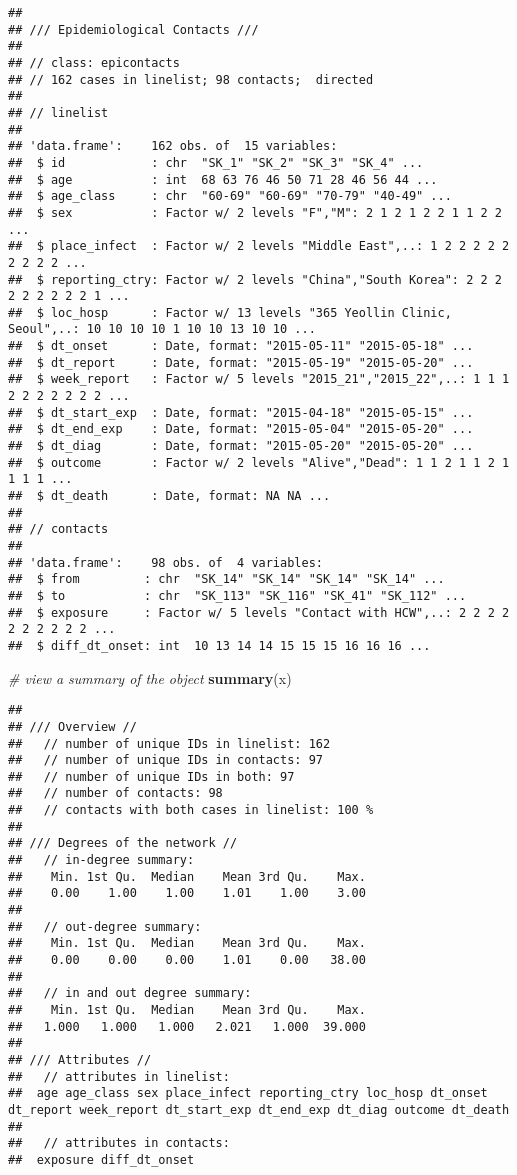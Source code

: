 \documentclass[9pt,a4paper,]{extarticle}
\newenvironment{Shaded}{\begin{snugshade}}{\end{snugshade}}
\newcommand{\KeywordTok}[1]{\textcolor[rgb]{0.13,0.29,0.53}{\textbf{#1}}}
\newcommand{\CommentTok}[1]{\textcolor[rgb]{0.56,0.35,0.01}{\textit{#1}}}
\newcommand{\NormalTok}[1]{#1}
\theoremstyle{definition}
\theoremstyle{definition}
\theoremstyle{definition}
\theoremstyle{remark}
\begin{document}
\begin{verbatim}
## 
## /// Epidemiological Contacts ///
## 
## // class: epicontacts
## // 162 cases in linelist; 98 contacts;  directed 
## 
## // linelist
## 
## 'data.frame':    162 obs. of  15 variables:
##  $ id            : chr  "SK_1" "SK_2" "SK_3" "SK_4" ...
##  $ age           : int  68 63 76 46 50 71 28 46 56 44 ...
##  $ age_class     : chr  "60-69" "60-69" "70-79" "40-49" ...
##  $ sex           : Factor w/ 2 levels "F","M": 2 1 2 1 2 2 1 1 2 2 ...
##  $ place_infect  : Factor w/ 2 levels "Middle East",..: 1 2 2 2 2 2 2 2 2 2 ...
##  $ reporting_ctry: Factor w/ 2 levels "China","South Korea": 2 2 2 2 2 2 2 2 2 1 ...
##  $ loc_hosp      : Factor w/ 13 levels "365 Yeollin Clinic, Seoul",..: 10 10 10 10 1 10 10 13 10 10 ...
##  $ dt_onset      : Date, format: "2015-05-11" "2015-05-18" ...
##  $ dt_report     : Date, format: "2015-05-19" "2015-05-20" ...
##  $ week_report   : Factor w/ 5 levels "2015_21","2015_22",..: 1 1 1 2 2 2 2 2 2 2 ...
##  $ dt_start_exp  : Date, format: "2015-04-18" "2015-05-15" ...
##  $ dt_end_exp    : Date, format: "2015-05-04" "2015-05-20" ...
##  $ dt_diag       : Date, format: "2015-05-20" "2015-05-20" ...
##  $ outcome       : Factor w/ 2 levels "Alive","Dead": 1 1 2 1 1 2 1 1 1 1 ...
##  $ dt_death      : Date, format: NA NA ...
## 
## // contacts
## 
## 'data.frame':    98 obs. of  4 variables:
##  $ from         : chr  "SK_14" "SK_14" "SK_14" "SK_14" ...
##  $ to           : chr  "SK_113" "SK_116" "SK_41" "SK_112" ...
##  $ exposure     : Factor w/ 5 levels "Contact with HCW",..: 2 2 2 2 2 2 2 2 2 2 ...
##  $ diff_dt_onset: int  10 13 14 14 15 15 15 16 16 16 ...
\end{verbatim}

\begin{Shaded}
\begin{Highlighting}[]
\CommentTok{# view a summary of the object                  }
\KeywordTok{summary}\NormalTok{(x)}
\end{Highlighting}
\end{Shaded}

\begin{verbatim}
## 
## /// Overview //
##   // number of unique IDs in linelist: 162
##   // number of unique IDs in contacts: 97
##   // number of unique IDs in both: 97
##   // number of contacts: 98
##   // contacts with both cases in linelist: 100 %
## 
## /// Degrees of the network //
##   // in-degree summary:
##    Min. 1st Qu.  Median    Mean 3rd Qu.    Max. 
##    0.00    1.00    1.00    1.01    1.00    3.00 
## 
##   // out-degree summary:
##    Min. 1st Qu.  Median    Mean 3rd Qu.    Max. 
##    0.00    0.00    0.00    1.01    0.00   38.00 
## 
##   // in and out degree summary:
##    Min. 1st Qu.  Median    Mean 3rd Qu.    Max. 
##   1.000   1.000   1.000   2.021   1.000  39.000 
## 
## /// Attributes //
##   // attributes in linelist:
##  age age_class sex place_infect reporting_ctry loc_hosp dt_onset dt_report week_report dt_start_exp dt_end_exp dt_diag outcome dt_death
## 
##   // attributes in contacts:
##  exposure diff_dt_onset
\end{verbatim}
\end{document}
